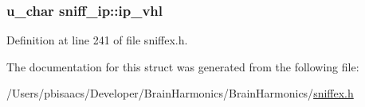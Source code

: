 \subsubsection[{\texorpdfstring{ip\+\_\+vhl}{ip_vhl}}]{\setlength{\rightskip}{0pt plus 5cm}u\+\_\+char sniff\+\_\+ip\+::ip\+\_\+vhl}\hypertarget{structsniff__ip_a8ced3d6237cb8b0538e73227843b4edb}{}\label{structsniff__ip_a8ced3d6237cb8b0538e73227843b4edb}


Definition at line 241 of file sniffex.\+h.



The documentation for this struct was generated from the following file\+:\begin{DoxyCompactItemize}
\item 
/\+Users/pbisaacs/\+Developer/\+Brain\+Harmonics/\+Brain\+Harmonics/\hyperlink{sniffex_8h}{sniffex.\+h}\end{DoxyCompactItemize}
